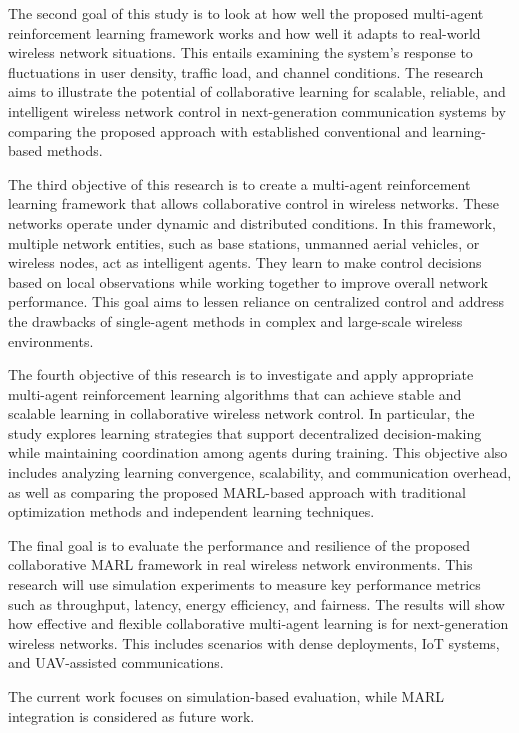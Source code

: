 \documentclass[a4paper,fleqn]{cas-dc}
\numberwithin{equation}{section}
\begin{document}
The second goal of this study is to look at how well the proposed multi-agent reinforcement learning framework works and how well it adapts to real-world wireless network situations. This entails examining the system's response to fluctuations in user density, traffic load, and channel conditions. The research aims to illustrate the potential of collaborative learning for scalable, reliable, and intelligent wireless network control in next-generation communication systems by comparing the proposed approach with established conventional and learning-based methods.

The third objective of this research is to create a multi-agent reinforcement learning framework that allows collaborative control in wireless networks. These networks operate under dynamic and distributed conditions. In this framework, multiple network entities, such as base stations, unmanned aerial vehicles, or wireless nodes, act as intelligent agents. They learn to make control decisions based on local observations while working together to improve overall network performance. This goal aims to lessen reliance on centralized control and address the drawbacks of single-agent methods in complex and large-scale wireless environments.

The fourth objective of this research is to investigate and apply appropriate multi-agent reinforcement learning algorithms that can achieve stable and scalable learning in collaborative wireless network control. In particular, the study explores learning strategies that support decentralized decision-making while maintaining coordination among agents during training. This objective also includes analyzing learning convergence, scalability, and communication overhead, as well as comparing the proposed MARL-based approach with traditional optimization methods and independent learning techniques.

The final goal is to evaluate the performance and resilience of the proposed collaborative MARL framework in real wireless network environments. This research will use simulation experiments to measure key performance metrics such as throughput, latency, energy efficiency, and fairness. The results will show how effective and flexible collaborative multi-agent learning is for next-generation wireless networks. This includes scenarios with dense deployments, IoT systems, and UAV-assisted communications.

The current work focuses on simulation-based evaluation, while MARL integration is considered as future work.
\end{document}
